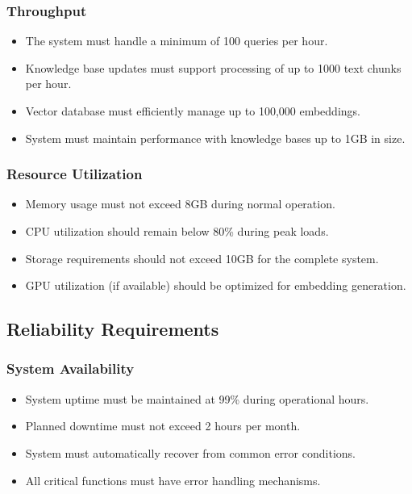 \documentclass[12pt,a4paper]{report}
\begin{document}
\subsubsection{Throughput}
\begin{itemize}
    \item The system must handle a minimum of 100 queries per hour.
    \item Knowledge base updates must support processing of up to 1000 text chunks per hour.
    \item Vector database must efficiently manage up to 100,000 embeddings.
    \item System must maintain performance with knowledge bases up to 1GB in size.
\end{itemize}

\subsubsection{Resource Utilization}
\begin{itemize}
    \item Memory usage must not exceed 8GB during normal operation.
    \item CPU utilization should remain below 80\% during peak loads.
    \item Storage requirements should not exceed 10GB for the complete system.
    \item GPU utilization (if available) should be optimized for embedding generation.
\end{itemize}

\subsection{Reliability Requirements}

\subsubsection{System Availability}
\begin{itemize}
    \item System uptime must be maintained at 99\% during operational hours.
    \item Planned downtime must not exceed 2 hours per month.
    \item System must automatically recover from common error conditions.
    \item All critical functions must have error handling mechanisms.
\end{itemize}
\end{document}
